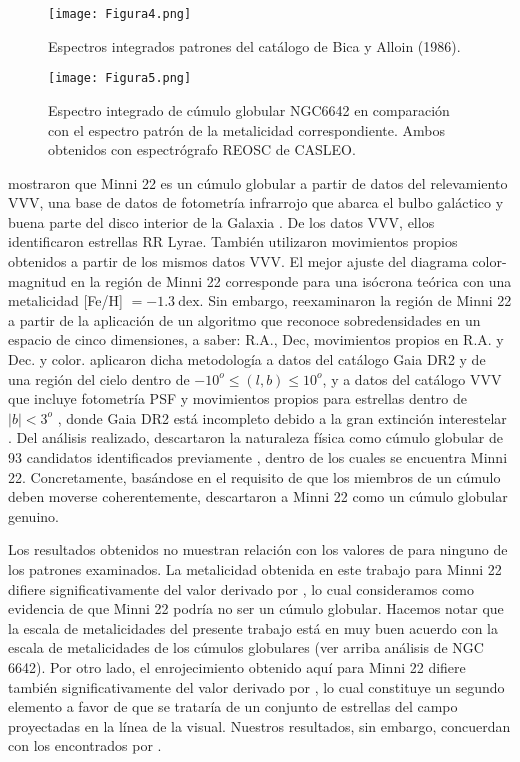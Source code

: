 \documentclass[baaa]{baaa}
\begin{document}
\begin{figure}
\centering
\texttt{[image: Figura4.png]}
\caption{Espectros integrados patrones del catálogo de Bica y Alloin (1986).}
\label{Figura4}
\end{figure}

\begin{figure}
\centering
\texttt{[image: Figura5.png]}
\caption{Espectro integrado de cúmulo globular NGC6642 en comparación con el espectro patrón de la metalicidad correspondiente. Ambos obtenidos con espectrógrafo REOSC de CASLEO.}
\label{Figura5}
\end{figure}


\cite{minniti-2018} mostraron que Minni 22 es un cúmulo globular a partir de datos del relevamiento VVV, una base de datos de fotometría infrarrojo que abarca el bulbo galáctico y buena parte del disco interior de la Galaxia \citep{VVV}.
De los datos VVV, ellos identificaron estrellas RR Lyrae. También utilizaron movimientos propios obtenidos a partir de los mismos datos VVV. El mejor ajuste del diagrama color-magnitud en la región de Minni 22 corresponde para una isócrona teórica con una metalicidad [Fe/H] $=-1.3~\mathrm{dex}$. Sin embargo, \cite{minniti-2019} reexaminaron la región de Minni 22 a partir de la aplicación de  un algoritmo que reconoce sobredensidades en un espacio de cinco dimensiones, a saber: R.A., Dec, movimientos propios en R.A. y Dec. y color.
\cite{minniti-2019} aplicaron dicha metodología a datos del catálogo Gaia DR2 \citep{gaia-2016} y \citep{gaia-2018} de una región del cielo dentro de $-10^o \leq (l, b) \leq 10^o$, y a datos del catálogo VVV que incluye fotometría PSF y movimientos propios para estrellas dentro de $|b|< 3^o$ , donde Gaia DR2 está incompleto  debido a la gran extinción interestelar \cite{minniti-2019}. Del análisis realizado, \cite{minniti-2019}
descartaron la naturaleza física como cúmulo globular de 93 candidatos identificados previamente \cite{minniti-2017}, dentro de los cuales se encuentra Minni 22.
Concretamente, basándose en el requisito de que los miembros de un cúmulo deben moverse coherentemente, \cite{minniti-2019} descartaron a Minni 22 como un cúmulo globular genuino. 

Los resultados obtenidos no muestran relación con los valores de \cite{minniti-2018} para ninguno de los patrones examinados. La metalicidad obtenida en este trabajo para Minni 22 difiere significativamente del valor derivado por \cite{minniti-2018}, lo cual consideramos como evidencia de que Minni 22 podría no ser un cúmulo globular. Hacemos notar que la escala de metalicidades del presente trabajo está en muy buen acuerdo con la escala  de metalicidades de los cúmulos globulares (ver arriba análisis de NGC 6642). Por otro lado, el enrojecimiento obtenido aquí para Minni 22 difiere también significativamente del valor derivado por \cite{minniti-2018}, lo cual constituye un segundo elemento a favor de que se trataría de un conjunto de estrellas del campo proyectadas en la línea de la visual. Nuestros resultados, sin embargo, concuerdan con los encontrados por \cite{minniti-2019}.
\end{document}
